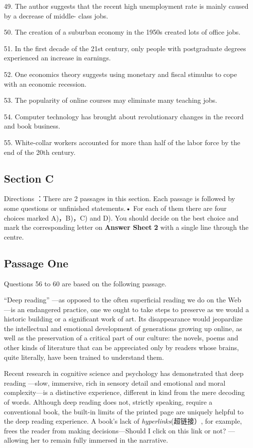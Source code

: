 \documentclass[UTF8,11pt]{ctexart}
\begin{document}
49. The author suggests that the recent high unemployment rate is mainly caused by a decrease of middle- class jobs.


50. The creation of a suburban economy in the 1950s created lots of office jobs.


51. In the first decade of the 21st century, only people with postgraduate degrees experienced an increase in earnings.


52. One economics theory suggests using monetary and fiscal stimulus to cope with an economic recession.


53. The popularity of online courses may eliminate many teaching jobs.


54. Computer technology has brought about revolutionary changes in the record and book business.


55. White-collar workers accounted for more than half of the labor force by the end of the 20th century.


\subsection*{Section C}


Directions ：There are 2 passages in this section. Each passage is followed by some questions or unfinished statements.• For each of them there are four choices marked A)，B)，C) and D). You should decide on the best choice and mark the corresponding letter on\textbf{ Answer Sheet} \textbf{2} with a single line through the centre.


\subsection*{\textbf{Passage One}}


Questions 56 to 60 are based on the following passage.


“Deep reading” —as opposed to the often superficial reading we do on the Web —is an endangered practice, one we ought to take steps to preserve as we would a historic building or a significant work of art. Its disappearance would jeopardize the intellectual and emotional development of generations growing up online, as well as the preservation of a critical part of our culture: the novels, poems and other kinds of literature that can be appreciated only by readers whose brains, quite literally, have been trained to understand them.


Recent research in cognitive science and psychology has demonstrated that deep reading —slow, immersive, rich in sensory detail and emotional and moral complexity—is a distinctive experience, different in kind from the mere decoding of words. Although deep reading does not, strictly speaking, require a conventional book, the built-in limits of the printed page are uniquely helpful to the deep reading experience. A book’s lack of\textit{ hyperlinks}(超链接）, for example, frees the reader from making decisions—Should I click on this link or not? —allowing her to remain fully immersed in the narrative.
\end{document}

